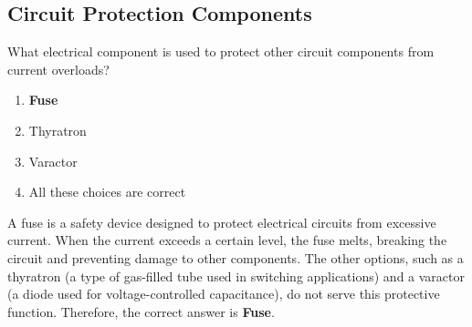\subsection{Circuit Protection Components}
\label{T6A09}

\begin{tcolorbox}[colback=gray!10!white,colframe=black!75!black,title=T6A09]
What electrical component is used to protect other circuit components from current overloads?
\begin{enumerate}[noitemsep]
    \item \textbf{Fuse}
    \item Thyratron
    \item Varactor
    \item All these choices are correct
\end{enumerate}
\end{tcolorbox}

A fuse is a safety device designed to protect electrical circuits from excessive current. When the current exceeds a certain level, the fuse melts, breaking the circuit and preventing damage to other components. The other options, such as a thyratron (a type of gas-filled tube used in switching applications) and a varactor (a diode used for voltage-controlled capacitance), do not serve this protective function. Therefore, the correct answer is \textbf{Fuse}.